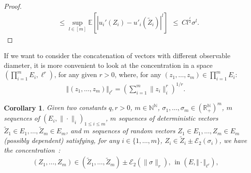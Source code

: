 \documentclass{ws-rmta}
\newcounter{ccorollary}
\newtheorem{corollaire}[ccorollary]{Corollary}
\begin{document}
\begin{proof}
\begin{align*}
    &\leq \sup_{l\in[m]} \mathbb{E}\left[ \left\vert u_i'\left(Z_i\right)-u'_i\left(\tilde Z_i\right)\right\vert^l \right]\ \ \leq \ C l^{\frac{l}{2}} \sigma^l.
  \end{align*}
\end{proof}

If we want to consider the concatenation of vectors with different observable diameter, it is more convenient to look at the concentration in a space $(\prod_{i=1}^m E_i, \ell^r)$, for any given $r>0$, where, for any $(z_1,\ldots, z_m) \in \prod_{i=1}^m E_i$:
\begin{align*}
  \left\Vert (z_1,\ldots, z_m)\right\Vert_{\ell^r} = \left(\sum_{i=1}^m \|z_i\|_i^r\right)^{1/r}.
\end{align*}
\begin{corollaire}\label{cor:concentration_concatenation_vecteur_lineaireent_concentre}
   Given two constants $q,r>0$, $m \in \mathbb N^{\mathbb N}$, $\sigma_1,\ldots,\sigma_m \in (\mathbb R_+^{\mathbb N}) ^m$, $m$ sequences of $(E_i, \|\cdot\|_i)_{1\leq i \leq m}$, $m$ sequences of deterministic vectors $\tilde Z_1\in E_1,\ldots, \tilde Z_m\in E_m$, and $m$ sequences of random vectors $Z_1 \in E_1,\ldots,Z_m \in E_m$ (possibly dependent) satisfying, for any $i\in\{1,\ldots ,m\}$, $Z_i \in \tilde Z_i \pm \mathcal E_2(\sigma_i)$, we have the concentration~:%
  \begin{align*}
    (Z_1,\ldots,Z_m) \in (\tilde Z_1,\ldots, \tilde Z_m) \pm \mathcal E_2(\|\sigma\|_r),
     \ \ \text{in } (E, \Vert \cdot \Vert_{\ell^r}),
  \end{align*}
\end{corollaire}
\end{document}
